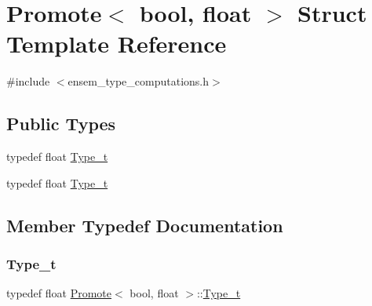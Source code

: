 \hypertarget{structPromote_3_01bool_00_01float_01_4}{}\section{Promote$<$ bool, float $>$ Struct Template Reference}
\label{structPromote_3_01bool_00_01float_01_4}


{\ttfamily \#include $<$ensem\+\_\+type\+\_\+computations.\+h$>$}

\subsection*{Public Types}
\begin{DoxyCompactItemize}
\item 
typedef float \mbox{\hyperlink{structPromote_3_01bool_00_01float_01_4_aa820b07e23d2dd7eee4a2344e3598502}{Type\+\_\+t}}
\item 
typedef float \mbox{\hyperlink{structPromote_3_01bool_00_01float_01_4_aa820b07e23d2dd7eee4a2344e3598502}{Type\+\_\+t}}
\end{DoxyCompactItemize}


\subsection{Member Typedef Documentation}
\mbox{\label{structPromote_3_01bool_00_01float_01_4_aa820b07e23d2dd7eee4a2344e3598502}} 
\subsubsection{\texorpdfstring{Type\_t}{Type\_t}\hspace{0.1cm}{\footnotesize\ttfamily [1/2]}}
{\footnotesize\ttfamily typedef float \mbox{\hyperlink{structPromote}{Promote}}$<$ bool, float $>$\+::\mbox{\hyperlink{structPromote_3_01bool_00_01float_01_4_aa820b07e23d2dd7eee4a2344e3598502}{Type\+\_\+t}}}

\mbox{\label{structPromote_3_01bool_00_01float_01_4_aa820b07e23d2dd7eee4a2344e3598502}} 
